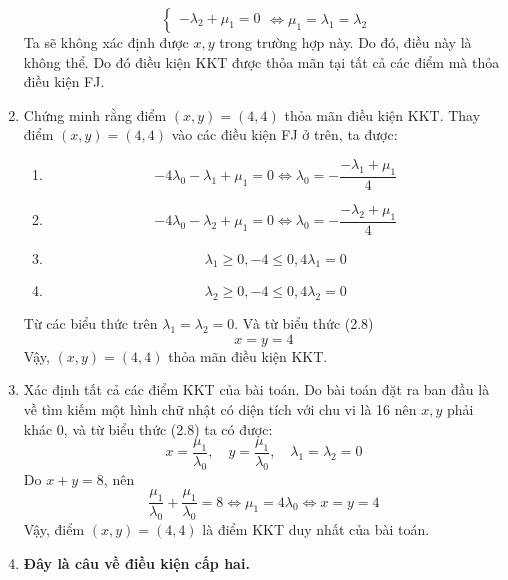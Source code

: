 \begin{solution}
\begin{enumerate}
\begin{equation}
\begin{cases}
            - \lambda_2 + \mu_1 = 0
        \end{cases}
        \Leftrightarrow \mu_1 =  \lambda_1 = \lambda_2
    \end{equation}
    Ta sẽ không xác định được $x, y$ trong trường hợp này. Do đó, điều này là không thể. Do đó điều kiện KKT được thỏa mãn tại tất cả các điểm mà thỏa điều kiện FJ.
    \item Chứng minh rằng điểm $(x,y) = (4,4)$ thỏa mãn điều kiện KKT. Thay điểm $(x,y) = (4,4)$ vào các điều kiện FJ ở trên, ta được:
    \begin{enumerate}[label=(\alph*)]
        \item \begin{equation}
            -4\lambda_0 - \lambda_1 + \mu_1 = 0 \Leftrightarrow \lambda_0 = -\frac{-\lambda_1+\mu_1}{4}
        \end{equation}
        \item \begin{equation}
            -4\lambda_0 - \lambda_2 + \mu_1 = 0 \Leftrightarrow \lambda_0 = -\frac{-\lambda_2+\mu_1}{4}
        \end{equation}
        \item \begin{equation}
            \lambda_1 \geq 0, - 4 \leq 0, 4\lambda_1 = 0
        \end{equation}
        \item \begin{equation}
            \lambda_2 \geq 0, - 4 \leq 0, 4\lambda_2 = 0
        \end{equation}
    \end{enumerate}
    Từ các biểu thức trên $\lambda_1 = \lambda_2 = 0$. Và từ biểu thức (2.8)
    \begin{equation}
        x = y =4
    \end{equation}
    Vậy, $(x,y) = (4,4)$ thỏa mãn điều kiện KKT.
    \item Xác định tất cả các điểm KKT của bài toán. Do bài toán đặt ra ban đầu là về tìm kiếm một hình chữ nhật có diện tích với chu vi là 16 nên $x, y$ phải khác 0, và từ biểu thức (2.8) ta có được:
    \begin{equation}
        x = \dfrac{\mu_1}{\lambda_0},\quad y = \dfrac{\mu_1}{\lambda_0}, \quad \lambda_1 = \lambda_2 = 0
    \end{equation}
    Do $x + y = 8$, nên
    \begin{equation}
        \dfrac{\mu_1}{\lambda_0} + \dfrac{\mu_1}{\lambda_0} = 8 \Leftrightarrow \mu_1 = 4\lambda_0 \Leftrightarrow x = y = 4
    \end{equation}
    Vậy, điểm $(x,y) = (4,4)$ là điểm KKT duy nhất của bài toán.
    \item \textbf{Đây là câu về điều kiện cấp hai.}
    \end{enumerate}
\end{solution}